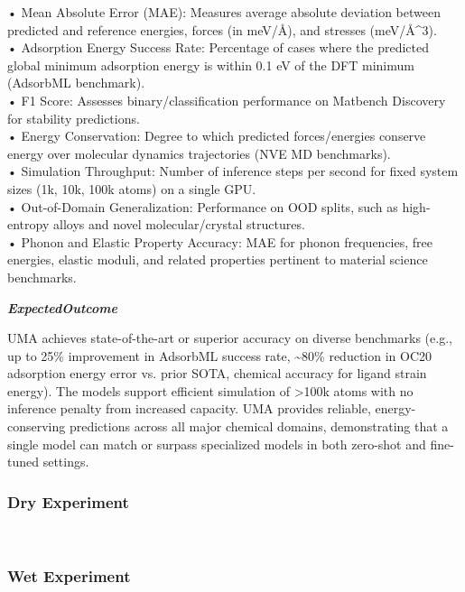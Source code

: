 \begin{tcolorbox}[
    breakable,
    title={Example of Idea Generation in Physics},
    colback=LighterGray,
    colframe=DeepPurple,
    colbacktitle=DeepPurple,
    coltitle=White,
]
• Mean Absolute Error (MAE): Measures average absolute deviation between predicted and reference energies, forces (in meV/Å), and stresses (meV/Å\^{}3). \\
• Adsorption Energy Success Rate: Percentage of cases where the predicted global minimum adsorption energy is within 0.1 eV of the DFT minimum (AdsorbML benchmark). \\
• F1 Score: Assesses binary/classification performance on Matbench Discovery for stability predictions. \\
• Energy Conservation: Degree to which predicted forces/energies conserve energy over molecular dynamics trajectories (NVE MD benchmarks). \\
• Simulation Throughput: Number of inference steps per second for fixed system sizes (1k, 10k, 100k atoms) on a single GPU. \\
• Out-of-Domain Generalization: Performance on OOD splits, such as high-entropy alloys and novel molecular/crystal structures. \\
• Phonon and Elastic Property Accuracy: MAE for phonon frequencies, free energies, elastic moduli, and related properties pertinent to material science benchmarks. 

\textbf{\emph{\textcolor{CaseOrange}{ExpectedOutcome}}}

UMA achieves state-of-the-art or superior accuracy on diverse benchmarks (e.g., up to 25\%
improvement in AdsorbML success rate, \~{}80\% reduction in OC20 adsorption energy error vs. prior
SOTA, chemical accuracy for ligand strain energy). The models support efficient simulation of >100k
atoms with no inference penalty from increased capacity. UMA provides reliable, energy-conserving
predictions across all major chemical domains, demonstrating that a single model can match or
surpass specialized models in both zero-shot and fine-tuned settings.

\end{tcolorbox}


\subsubsection{Dry Experiment}


\



% 

\subsubsection{Wet Experiment}

